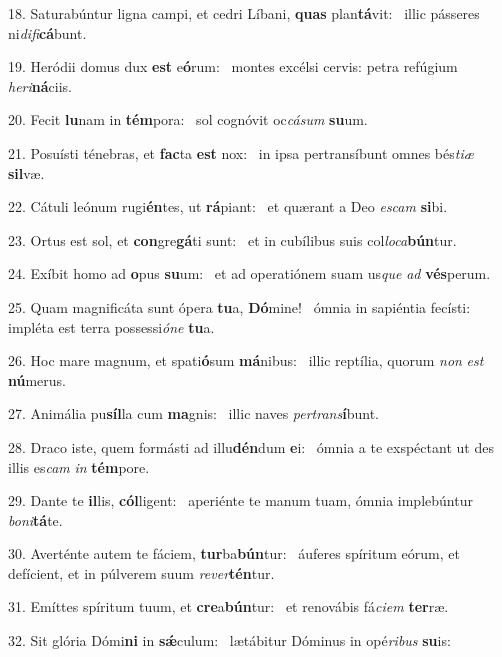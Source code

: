 18. Saturabúntur ligna campi, et cedri Líbani, \textbf{quas} plan\textbf{tá}vit: \ast\  illic pásseres ni\textit{di}\textit{fi}\textbf{cá}bunt.\

19. Heródii domus dux \textbf{est} e\textbf{ó}rum: \ast\  montes excélsi cervis: petra refúgium \textit{he}\textit{ri}\textbf{ná}ciis.\

20. Fecit \textbf{lu}nam in \textbf{tém}pora: \ast\  sol cognóvit oc\textit{cá}\textit{sum} \textbf{su}um.\

21. Posuísti ténebras, et \textbf{fac}ta \textbf{est} nox: \ast\  in ipsa pertransíbunt omnes bés\textit{ti}\textit{æ} \textbf{sil}væ.\

22. Cátuli leónum rugi\textbf{én}tes, ut \textbf{rá}piant: \ast\  et quærant a Deo \textit{es}\textit{cam} \textbf{si}bi.\

23. Ortus est sol, et \textbf{con}gre\textbf{gá}ti sunt: \ast\  et in cubílibus suis col\textit{lo}\textit{ca}\textbf{bún}tur.\

24. Exíbit homo ad \textbf{o}pus \textbf{su}um: \ast\  et ad operatiónem suam us\textit{que} \textit{ad} \textbf{vés}perum.\

25. Quam magnificáta sunt ópera \textbf{tu}a, \textbf{Dó}mine! \ast\  ómnia in sapiéntia fecísti: impléta est terra possessi\textit{ó}\textit{ne} \textbf{tu}a.\

26. Hoc mare magnum, et spati\textbf{ó}sum \textbf{má}nibus: \ast\  illic reptília, quorum \textit{non} \textit{est} \textbf{nú}merus.\

27. Animália pu\textbf{síl}la cum \textbf{ma}gnis: \ast\  illic naves \textit{per}\textit{trans}\textbf{í}bunt.\

28. Draco iste, quem formásti ad illu\textbf{dén}dum \textbf{e}i: \ast\  ómnia a te exspéctant ut des illis es\textit{cam} \textit{in} \textbf{tém}pore.\

29. Dante te \textbf{il}lis, \textbf{cól}ligent: \ast\  aperiénte te manum tuam, ómnia implebúntur \textit{bo}\textit{ni}\textbf{tá}te.\

30. Averténte autem te fáciem, \textbf{tur}ba\textbf{bún}tur: \ast\  áuferes spíritum eórum, et defícient, et in púlverem suum \textit{re}\textit{ver}\textbf{tén}tur.\

31. Emíttes spíritum tuum, et \textbf{cre}a\textbf{bún}tur: \ast\  et renovábis fá\textit{ci}\textit{em} \textbf{ter}ræ.\

32. Sit glória Dómi\textbf{ni} in \textbf{sǽ}culum: \ast\  lætábitur Dóminus in opé\textit{ri}\textit{bus} \textbf{su}is:\

